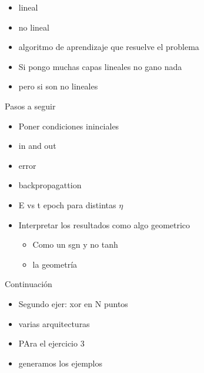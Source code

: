 \begin{itemize}
	\item lineal
	\item no lineal
	\item algoritmo de aprendizaje que resuelve el problema
	\item Si pongo muchas capas lineales no gano nada
	\item pero si son no lineales
\end{itemize}


Pasos a seguir
\begin{itemize}
	\item Poner condiciones ininciales
	\item in and out
	\item error
	\item backpropagattion
	\item E vs t epoch para distintas $\eta$
	\item Interpretar los resultados como algo geometrico
	\begin{itemize}
		\item Como un sgn y no tanh
		\item la geometría 
	\end{itemize}
\end{itemize}

Continuación

\begin{itemize}
	\item Segundo ejer: xor en N puntos
	\item varias arquitecturas
	\item PAra el ejercicio 3
	\item generamos los ejemplos
\end{itemize}

